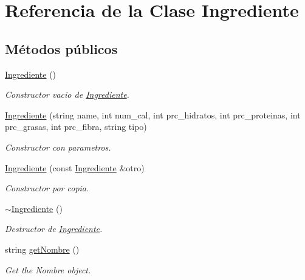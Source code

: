 \hypertarget{classIngrediente}{}\section{Referencia de la Clase Ingrediente}
\label{classIngrediente}
\subsection*{Métodos públicos}
\begin{DoxyCompactItemize}
\item 
\hyperlink{classIngrediente_ac39e59564451be4c0e12af8ce3d40afb}{Ingrediente} ()
\begin{DoxyCompactList}\small\item\em Constructor vacio de \hyperlink{classIngrediente}{Ingrediente}. \end{DoxyCompactList}\item 
\hyperlink{classIngrediente_ada434a334ca0001f26e32abdd69a3a48}{Ingrediente} (string name, int num\+\_\+cal, int prc\+\_\+hidratos, int prc\+\_\+proteinas, int prc\+\_\+grasas, int prc\+\_\+fibra, string tipo)
\begin{DoxyCompactList}\small\item\em Constructor con parametros. \end{DoxyCompactList}\item 
\hyperlink{classIngrediente_ac57c64894b162300d927bf5353ded318}{Ingrediente} (const \hyperlink{classIngrediente}{Ingrediente} \&otro)
\begin{DoxyCompactList}\small\item\em Constructor por copia. \end{DoxyCompactList}\item 
\mbox{\label{classIngrediente_a69ea09e0879ed116396ddac2c626b856}} 
\hyperlink{classIngrediente_a69ea09e0879ed116396ddac2c626b856}{$\sim$\+Ingrediente} ()
\begin{DoxyCompactList}\small\item\em Destructor de \hyperlink{classIngrediente}{Ingrediente}. \end{DoxyCompactList}\item 
string \hyperlink{classIngrediente_acabd25ebac52f95530cf35c1609c6ce2}{get\+Nombre} ()
\begin{DoxyCompactList}\small\item\em Get the Nombre object. \end{DoxyCompactList}\item 

\end{DoxyCompactItemize}
